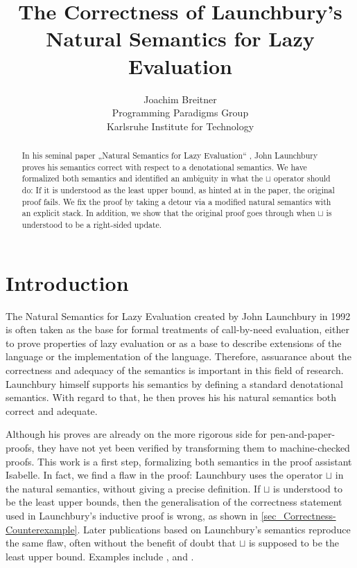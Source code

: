 \documentclass[11pt,a4paper,parskip=half]{scrartcl}
\begin{document}
\title{The Correctness of Launchbury's Natural Semantics for Lazy Evaluation}
\author{Joachim Breitner\\
Programming Paradigms Group\\
Karlsruhe Institute for Technology}
\maketitle

\begin{abstract}
In his seminal paper „Natural Semantics for Lazy Evaluation“ \cite{launchbury},
John Launchbury proves his semantics correct with respect to a denotational
semantics. We have formalized both semantics and identified an ambiguity in
what the $\sqcup$ operator should do: If it is understood as the least upper
bound, as hinted at in the paper, the original proof fails.  We fix the proof
by taking a detour via a modified natural semantics with an explicit stack. In
addition, we show that the original proof goes through when $\sqcup$ is
understood to be a right-sided update.
\end{abstract}

\tableofcontents

\section{Introduction}

The Natural Semantics for Lazy Evaluation \cite{launchbury} created by John Launchbury in 1992 is often taken as the base for formal treatments of call-by-need evaluation, either to prove properties of lazy evaluation or as a base to describe extensions of the language or the implementation of the language. Therefore, assuarance about the correctness and adequacy of the semantics is important in this field of research. Launchbury himself supports his semantics by defining a standard denotational semantics. With regard to that, he then proves his his natural semantics both correct and adequate.

Although his proves are already on the more rigorous side for pen-and-paper-proofs, they have not yet been verified by transforming them to machine-checked proofs. This work is a first step, formalizing both semantics in the proof assistant Isabelle. In fact, we find a flaw in the proof: Launchbury uses the operator $\sqcup$ in the natural semantics, without giving a precise definition. If $\sqcup$ is understood to be the least upper bounds, then the generalisation of the correctness statement used in Launchbury's inductive proof is wrong, as shown in \ref{sec_Correctness-Counterexample}. Later publications based on Launchbury’s semantics reproduce the same flaw, often without the benefit of doubt that $\sqcup$ is supposed to be the least upper bound. Examples include \cite{nakata_extended}
, \cite{mixed} and \cite{distributed}. 
\end{document}
